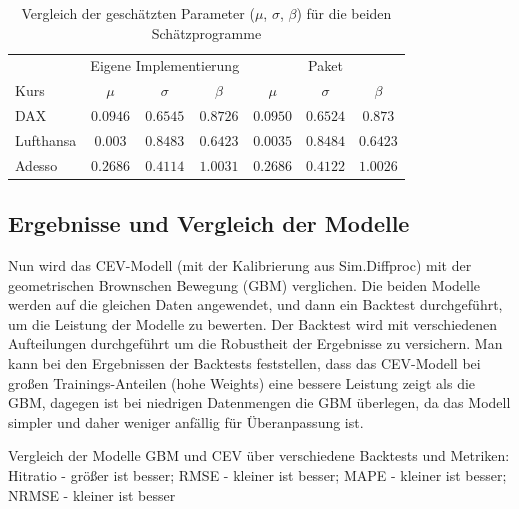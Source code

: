 \begin{table}[H]
\centering
\caption{Vergleich der geschätzten Parameter ($\mu$, $\sigma$, $\beta$) für die beiden Schätzprogramme}
\label{tab:compare_models_ab}
\begin{tabular}{lcccccc}
\hline
 & \multicolumn{3}{c}{Eigene Implementierung} & \multicolumn{3}{c}{Paket} \\
\cline{2-4}\cline{5-7}
Kurs & $\mu$ & $\sigma$ & $\beta$ & $\mu$ & $\sigma$ & $\beta$ \\
\hline
DAX & $0.0946$ & $0.6545$ & $0.8726$ & $0.0950$ & $0.6524$ & $0.873$ \\
Lufthansa & $0.003$ & $0.8483$ & $0.6423$ & $0.0035$ & $0.8484$ & $0.6423$ \\
Adesso & $0.2686$ & $0.4114$ & $1.0031$ & $0.2686$ & $0.4122$ & $1.0026$ \\
\hline
\end{tabular}
\end{table}

\subsection{Ergebnisse und Vergleich der Modelle}

Nun wird das CEV-Modell (mit der Kalibrierung aus Sim.Diffproc) mit der geometrischen Brownschen Bewegung (GBM) verglichen. Die beiden Modelle werden auf die gleichen Daten angewendet, und dann ein Backtest durchgeführt, um die Leistung der Modelle zu bewerten.
Der Backtest wird mit verschiedenen Aufteilungen durchgeführt um die Robustheit der Ergebnisse zu versichern.
Man kann bei den Ergebnissen der Backtests feststellen, dass das CEV-Modell bei großen Trainings-Anteilen (hohe Weights) eine bessere Leistung zeigt als die GBM, dagegen ist bei niedrigen Datenmengen die GBM überlegen, da das Modell simpler und daher weniger anfällig für Überanpassung ist.

\begin{table}
\centering
{}
\caption{Vergleich der Modelle GBM und CEV über verschiedene Backtests und Metriken: Hitratio - größer ist besser; RMSE - kleiner ist besser; MAPE - kleiner ist besser; NRMSE - kleiner ist besser}
\end{table}
